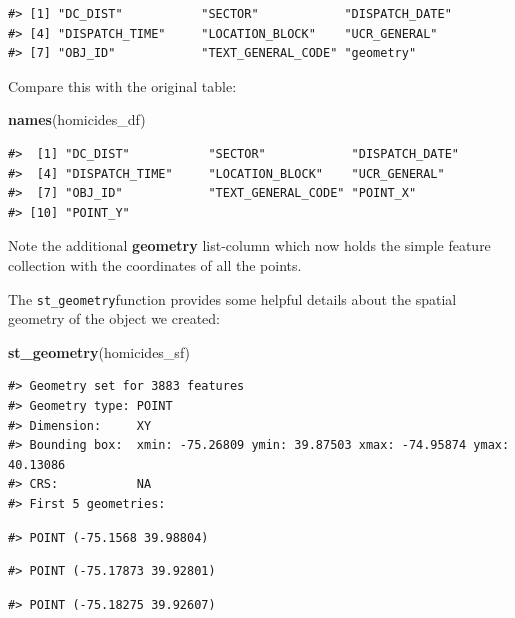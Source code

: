 \documentclass[
]{book}
\newenvironment{Shaded}{\begin{snugshade}}{\end{snugshade}}
\newcommand{\FunctionTok}[1]{\textcolor[rgb]{0.13,0.29,0.53}{\textbf{#1}}}
\newcommand{\NormalTok}[1]{#1}
\begin{document}
\begin{verbatim}
#> [1] "DC_DIST"           "SECTOR"            "DISPATCH_DATE"    
#> [4] "DISPATCH_TIME"     "LOCATION_BLOCK"    "UCR_GENERAL"      
#> [7] "OBJ_ID"            "TEXT_GENERAL_CODE" "geometry"
\end{verbatim}

Compare this with the original table:

\begin{Shaded}
\begin{Highlighting}[]
\FunctionTok{names}\NormalTok{(homicides\_df)}
\end{Highlighting}
\end{Shaded}

\begin{verbatim}
#>  [1] "DC_DIST"           "SECTOR"            "DISPATCH_DATE"    
#>  [4] "DISPATCH_TIME"     "LOCATION_BLOCK"    "UCR_GENERAL"      
#>  [7] "OBJ_ID"            "TEXT_GENERAL_CODE" "POINT_X"          
#> [10] "POINT_Y"
\end{verbatim}

Note the additional \textbf{geometry} list-column which now holds the simple feature collection with the coordinates of all the points.

The \texttt{st\_geometry}function provides some helpful details about the spatial geometry of the object we created:

\begin{Shaded}
\begin{Highlighting}[]
\FunctionTok{st\_geometry}\NormalTok{(homicides\_sf)}
\end{Highlighting}
\end{Shaded}

\begin{verbatim}
#> Geometry set for 3883 features 
#> Geometry type: POINT
#> Dimension:     XY
#> Bounding box:  xmin: -75.26809 ymin: 39.87503 xmax: -74.95874 ymax: 40.13086
#> CRS:           NA
#> First 5 geometries:
\end{verbatim}

\begin{verbatim}
#> POINT (-75.1568 39.98804)
\end{verbatim}

\begin{verbatim}
#> POINT (-75.17873 39.92801)
\end{verbatim}

\begin{verbatim}
#> POINT (-75.18275 39.92607)
\end{verbatim}
\end{document}

